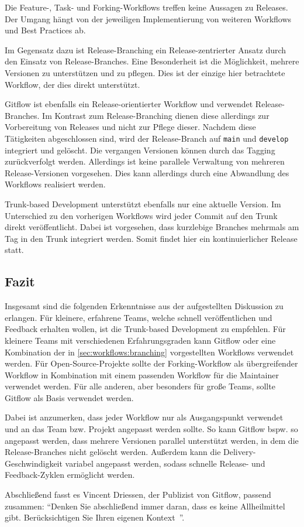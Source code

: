 Die Feature-, Task- und Forking\hyp Workflows treffen keine Aussagen zu Releases. Der Umgang hängt von der jeweiligen Implementierung von weiteren Workflows und Best Practices ab.

Im Gegensatz dazu ist Release\hyp Branching ein Release\hyp zentrierter Ansatz durch den Einsatz von Release\hyp Branches. Eine Besonderheit ist die Möglichkeit, mehrere Versionen zu unterstützen und zu pflegen. Dies ist der einzige hier betrachtete Workflow, der dies direkt unterstützt.

Gitflow ist ebenfalls ein Release\hyp orientierter Workflow und verwendet Release\hyp Branches. Im Kontrast zum Release\hyp Branching dienen diese allerdings zur Vorbereitung von Releases und nicht zur Pflege dieser. Nachdem diese Tätigkeiten abgeschlossen sind, wird der Release\hyp Branch auf \texttt{main} und \texttt{develop} integriert und gelöscht. Die vergangen Versionen können durch das Tagging zurückverfolgt werden. Allerdings ist keine parallele Verwaltung von mehreren Release\hyp Versionen vorgesehen. Dies kann allerdings durch eine Abwandlung des Workflows realisiert werden.

Trunk\hyp based Development unterstützt ebenfalls nur eine aktuelle Version. Im Unterschied zu den vorherigen Workflows wird jeder Commit auf den Trunk direkt veröffentlicht. Dabei ist vorgesehen, dass kurzlebige Branches mehrmals am Tag in den Trunk integriert werden. Somit findet hier ein kontinuierlicher Release statt.


\subsection{Fazit}
\label{sec:diskussion:conclusion}

Insgesamt sind die folgenden Erkenntnisse aus der aufgestellten Diskussion zu erlangen. Für kleinere, erfahrene Teams, welche schnell veröffentlichen und Feedback erhalten wollen, ist die Trunk\hyp based Development zu empfehlen. Für kleinere Teams mit verschiedenen Erfahrungsgraden kann Gitflow oder eine Kombination der in \autoref{sec:workflows:branching} vorgestellten Workflows verwendet werden. Für Open\hyp Source\hyp Projekte sollte der Forking\hyp Workflow als übergreifender Workflow in Kombination mit einem passenden Workflow für die Maintainer verwendet werden. Für alle anderen, aber besonders für große Teams, sollte Gitflow als Basis verwendet werden.

Dabei ist anzumerken, dass jeder Workflow nur als Ausgangspunkt verwendet und an das Team bzw. Projekt angepasst werden sollte. So kann Gitflow bspw. so angepasst werden, dass mehrere Versionen parallel unterstützt werden, in dem die Release\hyp Branches nicht gelöscht werden. Außerdem kann die Delivery\hyp Geschwindigkeit variabel angepasst werden, sodass schnelle Release- und Feedback\hyp Zyklen ermöglicht werden.

Abschließend fasst es Vincent Driessen, der Publizist von Gitflow, passend zusammen: \enquote{Denken Sie abschließend immer daran, dass es keine Allheilmittel gibt. Berücksichtigen Sie Ihren eigenen Kontext~\cite{driessenGitflow2012}}.
